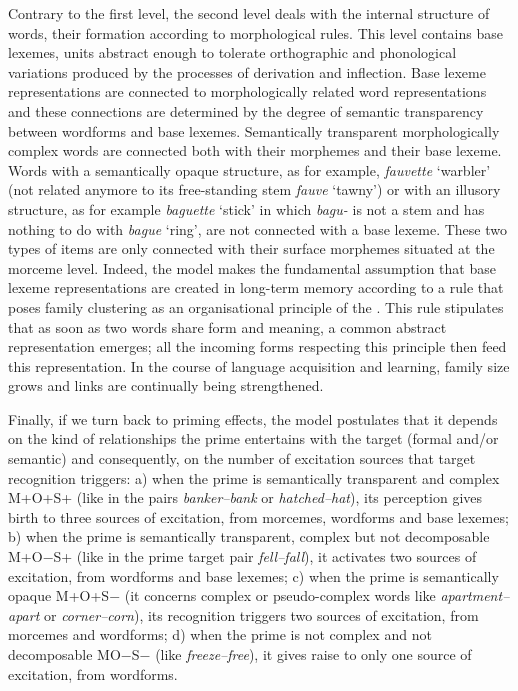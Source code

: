 \documentclass[output=paper]{langsci/langscibook}
\begin{document}
Contrary to the first level, the second level deals with the internal
structure of words, their formation according to morphological rules.
This level contains base lexemes, units abstract enough to tolerate
orthographic and phonological variations produced by the processes of
derivation and inflection. Base lexeme representations are connected to
morphologically related word representations and these connections are
determined by the degree of semantic transparency between wordforms and
base lexemes. Semantically transparent morphologically complex words are
connected both with their morphemes and their base lexeme. Words with a
semantically opaque structure, as for example, \emph{fauvette} `warbler'
(not related anymore to its free-standing stem \emph{fauve} `tawny') or
with an illusory structure, as for example \emph{baguette} `stick' in
which \emph{bagu-} is not a stem and has nothing to do with \emph{bague}
`ring', are not connected with a base lexeme. These two types of items
are only connected with their surface morphemes situated at the morceme
level. Indeed, the model makes the fundamental assumption that
base lexeme representations are created in long-term memory according to
a rule that poses family clustering as an organisational principle of
the . This rule stipulates that as soon as two words share
form and meaning, a common abstract representation emerges; all the
incoming forms respecting this principle then feed this representation.
In the course of language acquisition and learning, family size grows
and links are continually being strengthened.

Finally, if we turn back to priming effects, the model postulates that it
depends on the kind of relationships the prime entertains with the
target (formal and/or semantic) and consequently, on the number of
excitation sources that target recognition triggers: a) when the prime
is semantically transparent and complex M+O+S+ (like in the pairs
\emph{banker--bank} or \emph{hatched--hat}), its perception gives birth to
three sources of excitation, from morcemes, wordforms and base lexemes;
b) when the prime is semantically transparent, complex but not
decomposable M+O$-$S+ (like in the prime target pair \emph{fell--fall}), it
activates two sources of excitation, from wordforms and base lexemes;
c) when the prime is semantically opaque M+O+S$-$ (it concerns complex or
pseudo-complex words like \emph{apartment--apart} or \emph{corner--corn}),
its recognition triggers two sources of excitation, from morcemes and
wordforms; d) when the prime is not complex and not decomposable MO$-$S$-$
(like \emph{freeze--free}), it gives raise to only one source of
excitation, from wordforms.
\end{document}
